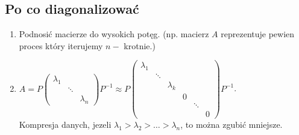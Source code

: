 \documentclass[10pt]{article}
\theoremstyle{definition}
\theoremstyle{definition}
\theoremstyle{definition}
\theoremstyle{definition}
\theoremstyle{remark}
\theoremstyle{definition}
\theoremstyle{definition}
\theoremstyle{definition}
\theoremstyle{definition}
\theoremstyle{definition}
\begin{document}
\subsection{Po co diagonalizować}
\begin{enumerate} 
    \item Podnosić macierze do wysokich potęg. (np. macierz $A$ reprezentuje pewien proces który iterujemy 
        $n-$ krotnie.)
    \item $ A = P \begin{pmatrix} \lambda_1 & & \\ & \ddots & \\ & & \lambda_n \end{pmatrix} P^{-1} 
        \approx P \begin{pmatrix} \lambda_1 & & & & & \\ 
                                    & \ddots & & & & \\ 
                                    & & \lambda_k & & & \\ 
                                    & & & 0 & & \\ 
                                    & & & & \ddots & \\ 
                                    & & & & & 0 \end{pmatrix} P^{-1}$.\\ 
                                    Kompresja danych, jezeli $\lambda_1 > 
                                    \lambda_2 > \ldots > \lambda_n$, to można zgubić mniejsze.
\end{enumerate} 
\end{document}
